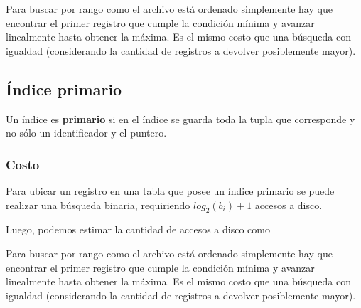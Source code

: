 \documentclass[]{article}
\begin{document}
Para buscar por rango como el archivo está ordenado simplemente hay que encontrar el primer registro que cumple la condición mínima y avanzar linealmente hasta obtener la máxima. Es el mismo costo que una búsqueda con igualdad (considerando la cantidad de registros a devolver posiblemente mayor).

\subsection{Índice primario}
Un índice es \textbf{primario} si en el índice se guarda toda la tupla que corresponde y no sólo un identificador y el puntero.







\subsubsection{Costo}
Para ubicar un registro en una tabla que posee un índice primario se puede realizar una búsqueda binaria, requiriendo $log_2(b_i) + 1$ accesos a disco.

Luego, podemos estimar la cantidad de accesos a disco como


Para buscar por rango como el archivo está ordenado simplemente hay que encontrar el primer registro que cumple la condición mínima y avanzar linealmente hasta obtener la máxima. Es el mismo costo que una búsqueda con igualdad (considerando la cantidad de registros a devolver posiblemente mayor).

\end{document}

